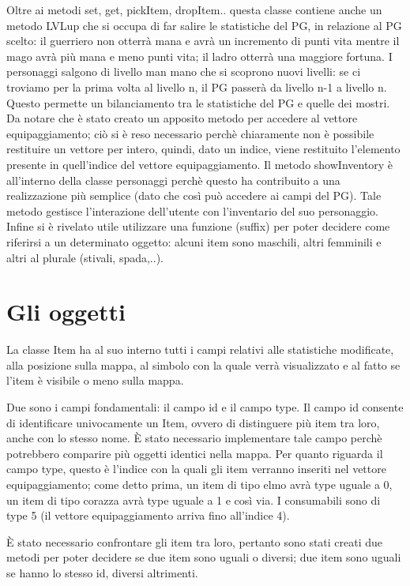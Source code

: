\documentclass[12pt]{report}
\begin{document}
Oltre ai metodi set, get, pickItem, dropItem.. questa classe contiene anche un metodo LVLup che si occupa
di far salire le statistiche del PG, in relazione al PG scelto: il guerriero non otterrà mana e avrà un
incremento di punti vita mentre il mago avrà più mana e meno punti vita; il ladro otterrà una maggiore
fortuna. I personaggi salgono di livello man mano che si scoprono nuovi livelli: se ci troviamo per la prima volta al
livello n, il PG passerà da livello n-1 a livello n. Questo permette un bilanciamento tra
le statistiche del PG e quelle dei mostri.
Da notare che è stato creato un apposito metodo per accedere al vettore equipaggiamento; ciò si è reso
necessario perchè chiaramente non è possibile restituire un vettore per intero, quindi, dato un indice,
viene restituito l'elemento presente in quell'indice del vettore equipaggiamento.
Il metodo showInventory è all'interno della classe personaggi perchè questo ha contribuito a una 
realizzazione più semplice (dato che così può accedere ai campi del PG). Tale metodo gestisce
l'interazione dell'utente con l'inventario del suo personaggio.
Infine si è rivelato utile utilizzare una funzione (suffix) per poter decidere come riferirsi a un
determinato oggetto: alcuni item sono maschili, altri femminili e altri al plurale (stivali, spada,..).

\section{Gli oggetti}

La classe Item ha al suo interno tutti i campi relativi alle statistiche modificate, alla posizione sulla
mappa, al simbolo con la quale verrà visualizzato e al fatto se l'item è visibile o meno sulla mappa.

Due sono i campi fondamentali: il campo id e il campo type.
Il campo id consente di identificare univocamente un Item, ovvero di distinguere più item tra loro,
anche con lo stesso nome. È stato necessario implementare tale campo perchè potrebbero comparire più 
oggetti identici nella mappa. Per quanto riguarda il campo type, questo è l'indice con la quali gli item
verranno inseriti nel vettore equipaggiamento; come detto prima, un item di tipo elmo avrà type uguale a
0, un item di tipo corazza avrà type uguale a 1 e così via. I consumabili sono di type 5 (il vettore 
equipaggiamento arriva fino all'indice 4). 

È stato necessario confrontare gli item tra loro, pertanto sono stati creati due metodi per poter
decidere se due item sono uguali o diversi; due item sono uguali se hanno lo stesso id, diversi altrimenti.
\end{document}
